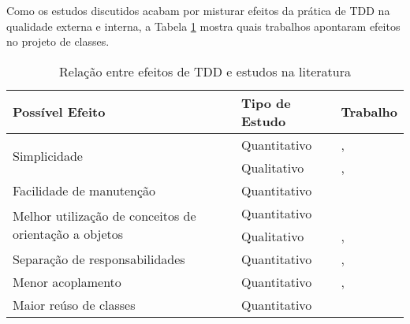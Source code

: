 Como os estudos discutidos acabam por misturar efeitos da prática de TDD na
qualidade externa e interna, a Tabela \ref{tab:comparativo} mostra
quais trabalhos apontaram efeitos no projeto de classes.

\begin{table}
	\centering
	\begin{tabular}{ | l | l | l |}
		
		\hline
		
		Possível Efeito & Tipo de Estudo & Trabalho\\

		\hline
		
		\multirow{2}{*}{Simplicidade}                          & Quantitativo & \cite{janzen-arch-improvement}, \cite{janzen-saiedian} \\
		                                           			   & Qualitativo  & \cite{angela-li}, \cite{george-e-williams}\\
		
		\hline
		
		Facilidade de manutenção                               & Quantitativo & \cite{langr}\\
		
		\hline
		
		\multirow{2}{*}{Melhor utilização de conceitos de orientação a objetos} & Quantitativo & \cite{janzen-saiedian}\\
		 													   & Qualitativo  & \cite{angela-li}, \cite{proulx}\\
		
		\hline
		
		Separação de responsabilidades                         & Quantitativo & \cite{janzen-saiedian}, \cite{steinberg}\\
		
		\hline
		
		Menor acoplamento                                      & Quantitativo & \cite{janzen-saiedian}, \cite{steinberg}\\
		
		\hline
		
		Maior reúso de classes                                 & Quantitativo & \cite{muller-e-hagner} \\

		\hline

	\end{tabular}
	\caption{Relação entre efeitos de TDD e estudos na literatura}
	\label{tab:comparativo}
\end{table}


